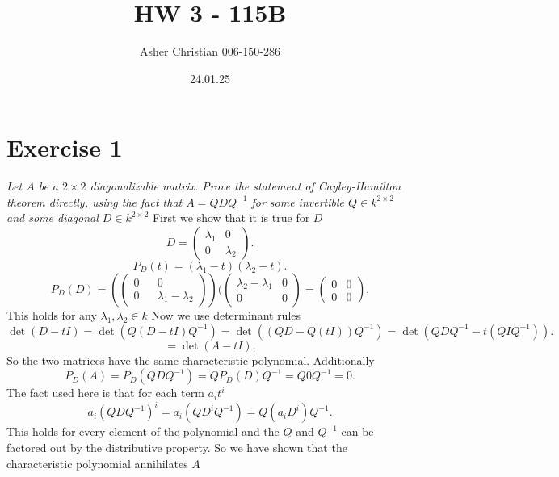 \documentclass{article}
\title{HW 3 - 115B}
\author{Asher Christian 006-150-286}
\date{ 24.01.25}
\begin{document}
    \maketitle
    \section{Exercise 1}
    \emph{
        Let $A$ be a $2 \times 2$ diagonalizable matrix. Prove the statement
        of Cayley-Hamilton theorem directly, using the fact that $A = QDQ^{-1}$
        for some invertible  $Q \in k^{2 \times 2}$ and some diagonal $D \in k^{2 \times 2}$
    }
    First we show that it is true for $D$ 
    \[
        D = \begin{pmatrix} \lambda_1 & 0 \\ 0 & \lambda_2 \end{pmatrix} 
    .\] 
    \[
    P_D(t) = (\lambda_1-t)(\lambda_2-t)
    .\] 
    \[
        P_D(D) = (\begin{pmatrix} 0 && 0 \\ 0 && \lambda_1-\lambda_2 \end{pmatrix} )(\begin{pmatrix} \lambda_2-\lambda_1 & 0 \\ 0 & 0 \end{pmatrix}  = \begin{pmatrix} 0 & 0 \\ 0 & 0 \end{pmatrix} 
    .\] 
    This holds for any $\lambda_1, \lambda_2 \in k$ Now we use determinant rules
    \[
    \det(D-tI) = \det(Q(D-tI)Q^{-1}) = \det((QD-Q(tI))Q^{-1}) = \det(QDQ^{-1} - t(QIQ^{-1}))
    .\] 
    \[
    = \det(A - tI)
    .\] 
    So the two matrices have the same characteristic polynomial.
    Additionally
    \[
    P_D(A) = P_D(QDQ^{-1}) = QP_D(D)Q^{-1} = Q0Q^{-1} = 0
    .\] 
    The fact used here is that for each term $a_it^{i}$ 
    \[
    a_i(QDQ^{-1})^{i} = a_i(QD^{i}Q^{-1}) = Q(a_iD^{i})Q^{-1}
    .\] 
    This holds for every element of the polynomial and the $Q$ and $Q^{-1}$
    can be factored out by the distributive property.
    So we have shown that the characteristic polynomial annihilates $A$
\end{document}
